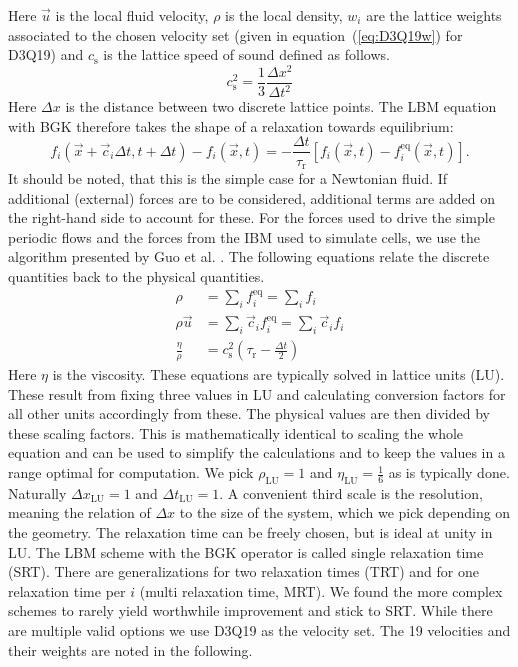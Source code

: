 \documentclass[a4paper,12pt]{scrartcl}
\begin{document}
	Here $\vec{u}$ is the local fluid velocity, $\rho$ is the local density, $w_i$ are the lattice weights associated to the chosen velocity set (given in equation~(\ref{eq:D3Q19w}) for D3Q19) and $c_\text{s}$ is the lattice speed of sound defined as follows.
	\begin{equation}
		c_\text{s}^2 = \frac{1}{3}\frac{\Delta x^2}{\Delta t^2}
	\end{equation}
	Here $\Delta x$ is the distance between two discrete lattice points.
	The LBM equation with BGK therefore takes the shape of a relaxation towards equilibrium:
	\begin{equation}
		f_i\left(\vec{x}+\vec{c}_i\Delta t, t+\Delta t\right) - f_i\left(\vec{x}, t\right) = -\frac{\Delta t}{\tau_\text{r}}\left[f_i\left(\vec{x}, t\right) - f_i^\text{eq}\left(\vec{x}, t\right)\right].
	\end{equation}
	It should be noted, that this is the simple case for a Newtonian fluid.
	If additional (external) forces are to be considered, additional terms are added on the right-hand side to account for these.
	For the forces used to drive the simple periodic flows and the forces from the IBM used to simulate cells, we use the algorithm presented by Guo et al. \cite{guo2002}.
	The following equations relate the discrete quantities back to the physical quantities.
	\begin{align}
		\rho &= \sum_if_i^\text{eq} = \sum_if_i \\
		\rho\vec{u} &= \sum_i\vec{c}_if_i^\text{eq} = \sum_i\vec{c}_if_i \\
		\frac{\eta}{\rho} &= c_\text{s}^2\left(\tau_\text{r} - \frac{\Delta t}{2}\right)
	\end{align}
	Here $\eta$ is the viscosity.
	These equations are typically solved in lattice units (LU).
	These result from fixing three values in LU and calculating conversion factors for all other units accordingly from these.
	The physical values are then divided by these scaling factors.
	This is mathematically identical to scaling the whole equation and can be used to simplify the calculations and to keep the values in a range optimal for computation.
	We pick $\rho_\text{LU} = 1$ and $\eta_\text{LU} = \frac{1}{6}$ as is typically done.
	Naturally $\Delta x_\text{LU} = 1$ and $\Delta t_\text{LU} = 1$.
	A convenient third scale is the resolution, meaning the relation of $\Delta x$ to the size of the system, which we pick depending on the geometry.
	The relaxation time can be freely chosen, but is ideal at unity in LU.
	The LBM scheme with the BGK operator is called single relaxation time (SRT).
	There are generalizations for two relaxation times (TRT) and for one relaxation time per $i$ (multi relaxation time, MRT).
	We found the more complex schemes to rarely yield worthwhile improvement and stick to SRT.
	While there are multiple valid options we use D3Q19 as the velocity set.
	The 19 velocities and their weights are noted in the following.
	
\end{document}
